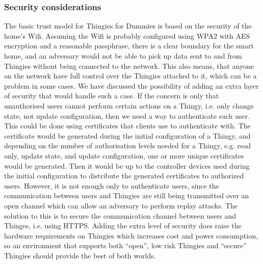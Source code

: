 \documentclass{ubicomp2012}
\begin{document}
\subsubsection{Security considerations}

The basic trust model for Thingies for Dummies is based on the security of the home's Wifi. Assuming the Wifi is probably configured using WPA2 with AES encryption and a reasonable passphrase, there is a clear boundary for the smart home, and an adversary would not be able to pick up data sent to and from Thingies without being connected to the network. This also means, that anyone on the network have full control over the Thingies attached to it, which can be a problem in some cases. We have discussed the possibility of adding an extra layer of security that would handle such a case. If the concern is only that unauthorised users cannot perform certain actions on a Thingy, i.e. only change state, not update configuration, then we need a way to authenticate each user. This could be done using certificates that clients use to authenticate with. The certificate would be generated during the initial configuration of a Thingy, and depending on the number of authorisation levels needed for a Thingy, e.g. read only, update state, and update configuration, one or more unique certificates would be generated. Then it would be up to the controller devices used during the initial configuration to distribute the generated certificates to authorized users. However, it is not enough only to authenticate users, since the communication between users and Thingies are still being transmitted over an open channel which can allow an adversary to perform replay attacks. The solution to this is to secure the communication channel between users and Thinges, i.e. using HTTPS. Adding the extra level of security does raise the hardware requirements on Thingies which increases cost and power consumption, so an environment that supports both ``open'', low risk Thingies and ``secure'' Thingies should provide the best of both worlds.



\end{document}

